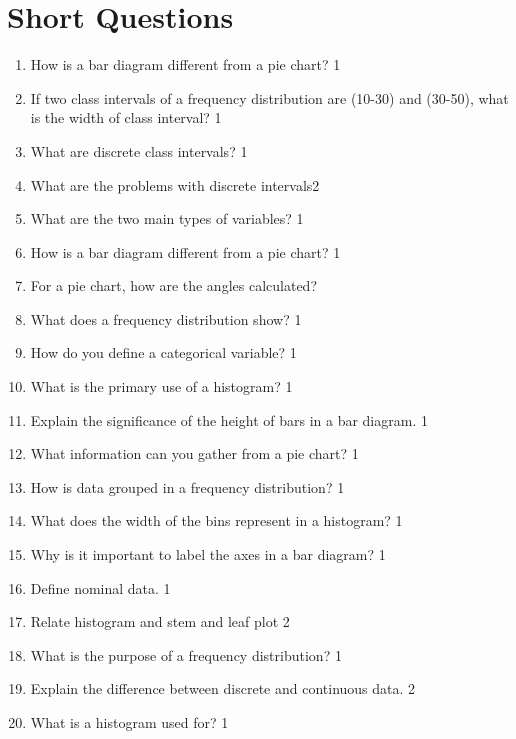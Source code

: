 \documentclass[a4paper,oneside]{book}
\begin{document}
\section{Short Questions}

\begin{enumerate}

\item How is a bar diagram different from a pie chart? \hfill 1

 \item If two class intervals of a frequency distribution are (10-30) and 
 (30-50), what is the width of class interval? \hfill 1

  \item   What are discrete class intervals? \hfill 1
    \item 	What are the problems with discrete intervals\hfill 2
    \item What are the two main types of variables? \hfill 1

\item How is a bar diagram different from a pie chart? \hfill 1

  \item For a pie chart, how are the angles calculated?

\item What does a frequency distribution show? \hfill 1

\item How do you define a categorical variable? \hfill 1

\item What is the primary use of a histogram? \hfill 1

\item Explain the significance of the height of bars in a bar diagram. \hfill 1

\item What information can you gather from a pie chart? \hfill 1

\item How is data grouped in a frequency distribution? \hfill 1

\item What does the width of the bins represent in a histogram? \hfill 1

\item Why is it important to label the axes in a bar diagram? \hfill 1

\item Define nominal data. \hfill 1
  \item Relate histogram and stem and leaf plot \hfill 2

\item What is the purpose of a frequency distribution? \hfill 1

\item Explain the difference between discrete and continuous data. \hfill 2

\item What is a histogram used for? \hfill 1



\end{enumerate}
\end{document}
